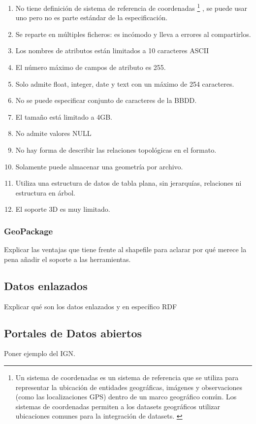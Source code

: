\begin{enumerate} 
    \item No tiene definición de sistema de referencia de coordenadas
            \footnote{Un sistema de coordenadas es un sistema de referencia que se utiliza para
            representar la ubicación de entidades geográficas, imágenes y observaciones (como las localizaciones GPS)
            dentro de un marco geográfico común. Los sistemas de coordenadas permiten a los datasets geográficos
            utilizar ubicaciones comunes para la integración de datasets. \cite{coordenadas}}
        , se puede usar uno pero no es parte estándar de la especificación.     
    \item Se reparte en múltiples ficheros: es incómodo y lleva a errores al compartirlos.  
    \item Los nombres de atributos están limitados a 10 caracteres ASCII
    \item El número máximo de campos de atributo es 255.
    \item Solo admite float, integer, date y text con un máximo de 254 caracteres.
    \item No se puede especificar conjunto de caracteres de la BBDD.
    \item El tamaño está limitado a 4GB.
    \item No admite valores NULL
    \item No hay forma de describir las relaciones topológicas en el formato.
    \item Solamente puede almacenar una geometría por archivo.
    \item Utiliza una estructura de datos de tabla plana, sin jerarquías, relaciones ni estructura en árbol.
    \item El soporte 3D es muy limitado.
\end{enumerate}

\subsubsection{GeoPackage} Explicar las ventajas que tiene frente al shapefile para aclarar
por qué merece la pena añadir el soporte a las herramientas.

\subsection{Datos enlazados} Explicar qué son los datos enlazados y en específico RDF

\subsection{Portales de Datos abiertos} Poner ejemplo del IGN.

